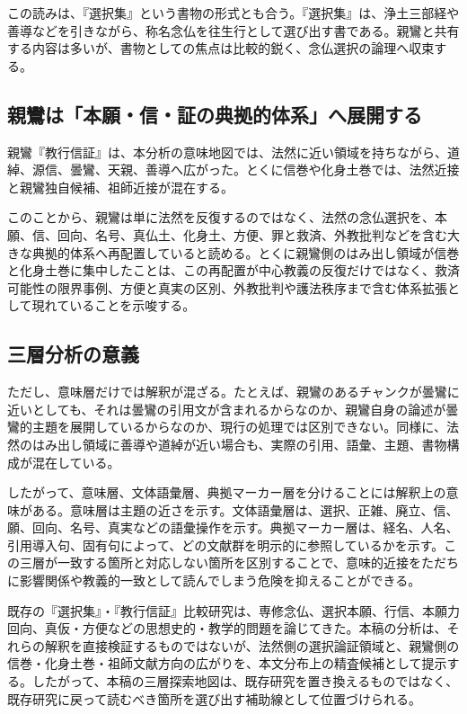 \documentclass[uplatex,dvipdfmx,11pt,a4paper]{jsarticle}
\begin{document}
この読みは、『選択集』という書物の形式とも合う。『選択集』は、浄土三部経や善導などを引きながら、称名念仏を往生行として選び出す書である。親鸞と共有する内容は多いが、書物としての焦点は比較的鋭く、念仏選択の論理へ収束する。

\subsection{親鸞は「本願・信・証の典拠的体系」へ展開する}

親鸞『教行信証』は、本分析の意味地図では、法然に近い領域を持ちながら、道綽、源信、曇鸞、天親、善導へ広がった。とくに信巻や化身土巻では、法然近接と親鸞独自候補、祖師近接が混在する。

このことから、親鸞は単に法然を反復するのではなく、法然の念仏選択を、本願、信、回向、名号、真仏土、化身土、方便、罪と救済、外教批判などを含む大きな典拠的体系へ再配置していると読める。とくに親鸞側のはみ出し領域が信巻と化身土巻に集中したことは、この再配置が中心教義の反復だけではなく、救済可能性の限界事例、方便と真実の区別、外教批判や護法秩序まで含む体系拡張として現れていることを示唆する。

\subsection{三層分析の意義}

ただし、意味層だけでは解釈が混ざる。たとえば、親鸞のあるチャンクが曇鸞に近いとしても、それは曇鸞の引用文が含まれるからなのか、親鸞自身の論述が曇鸞的主題を展開しているからなのか、現行の処理では区別できない。同様に、法然のはみ出し領域に善導や道綽が近い場合も、実際の引用、語彙、主題、書物構成が混在している。

したがって、意味層、文体語彙層、典拠マーカー層を分けることには解釈上の意味がある。意味層は主題の近さを示す。文体語彙層は、選択、正雑、廃立、信、願、回向、名号、真実などの語彙操作を示す。典拠マーカー層は、経名、人名、引用導入句、固有句によって、どの文献群を明示的に参照しているかを示す。この三層が一致する箇所と対応しない箇所を区別することで、意味的近接をただちに影響関係や教義的一致として読んでしまう危険を抑えることができる。

既存の『選択集』・『教行信証』比較研究は、専修念仏、選択本願、行信、本願力回向、真仮・方便などの思想史的・教学的問題を論じてきた。本稿の分析は、それらの解釈を直接検証するものではないが、法然側の選択論証領域と、親鸞側の信巻・化身土巻・祖師文献方向の広がりを、本文分布上の精査候補として提示する。したがって、本稿の三層探索地図は、既存研究を置き換えるものではなく、既存研究に戻って読むべき箇所を選び出す補助線として位置づけられる。
\end{document}
